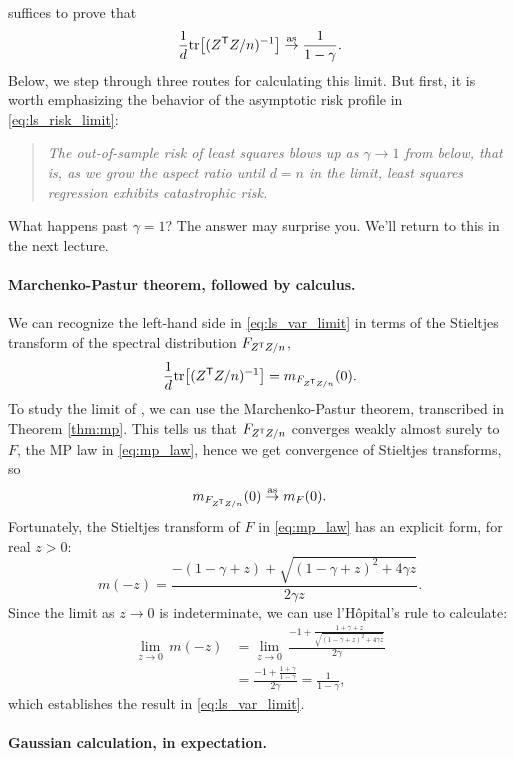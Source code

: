 \documentclass{article}
\begin{document}
suffices to prove that   
\begin{equation}
\label{eq:ls_var_limit}
\frac{1}{d} \mathrm{tr} \big[ (Z^{\mathsf{T}} Z/n)^{-1} \big] \overset{\mathrm{as}}{\to} \frac{1}{1-\gamma}.
\end{equation}
Below, we step through three routes for calculating this limit. But first, it is
worth emphasizing the behavior of the asymptotic risk profile in
\eqref{eq:ls_risk_limit}:  
\begin{quote}
\centering\it
The out-of-sample risk of least squares blows up as $\gamma \to 1$ from below,
that is, as we grow the aspect ratio until $d = n$ in the limit, least squares
regression exhibits catastrophic risk.  
\end{quote}
What happens past $\gamma = 1$? The answer may surprise you. We'll return to
this in the next lecture.  

\paragraph{Marchenko-Pastur theorem, followed by calculus.}  

We can recognize the left-hand side in \eqref{eq:ls_var_limit} in terms of the
Stieltjes transform of the spectral distribution $F_{Z^{\mathsf{T}} Z/n}$,  
\[
\frac{1}{d} \mathrm{tr} \big[ (Z^{\mathsf{T}} Z/n)^{-1} \big] = m_{F_{Z^{\mathsf{T}} Z/n}}(0).
\]
To study the limit of , we can use the
Marchenko-Pastur theorem, transcribed in Theorem \ref{thm:mp}. This tells us
that $F_{Z^{\mathsf{T}} Z/n}$ converges weakly almost surely to $F$, the MP law in
\eqref{eq:mp_law}, hence we get convergence of Stieltjes transforms, so     
\[
m_{F_{Z^{\mathsf{T}} Z/n}}(0) \overset{\mathrm{as}}{\to} m_F(0).
\]
Fortunately, the Stieltjes transform of $F$ in \eqref{eq:mp_law} has an explicit
form, for real $z>0$:    
\begin{equation}
\label{eq:mp_stieltjes}
m(-z) = \frac{-(1 - \gamma + z) + \sqrt{(1 - \gamma + z)^2 + 4 \gamma z}}{2
  \gamma z}. 
\end{equation}
Since the limit as $z \to 0$ is indeterminate, we can use l'H{\^o}pital's rule
to calculate:   
\begin{align*}
\lim_{z \to 0} \, m(-z) 
&= \lim_{z \to 0} \, \frac{-1 + \frac{1+\gamma+z}
  {\sqrt{(1-\gamma+z)^2 + 4\gamma z}}}{2\gamma} \\
&= \frac{-1+\frac{1+\gamma}{1-\gamma}}{2\gamma} 
= \frac{1}{1-\gamma},
\end{align*}
which establishes the result in \eqref{eq:ls_var_limit}. 

\paragraph{Gaussian calculation, in expectation.} 
\end{document}
